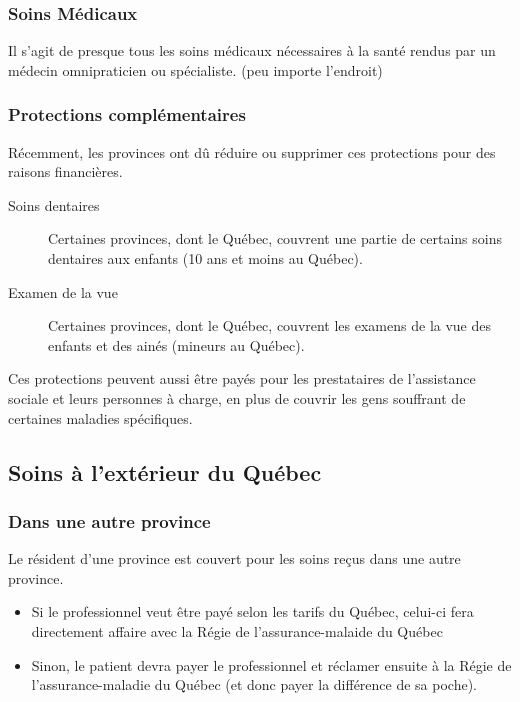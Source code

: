 \documentclass[10pt, french]{article}
\begin{document}
\begin{multicols*}{3}
	\subsubsection*{Soins Médicaux}
	Il s'agit de presque tous les soins médicaux nécessaires à la santé rendus par un médecin omnipraticien ou spécialiste. (peu importe l'endroit)
	

	\subsubsection*{Protections complémentaires}
	Récemment, les provinces ont dû réduire ou supprimer ces protections pour des raisons financières.
	\begin{description}
	\item[Soins dentaires] Certaines provinces, dont le Québec, couvrent une partie de certains soins dentaires aux enfants (10 ans et moins au Québec). 

	\item[Examen de la vue] Certaines provinces, dont le Québec, couvrent les examens de la vue des enfants et des ainés (mineurs au Québec).
	\end{description}
	Ces protections peuvent aussi être payés pour les prestataires de l'assistance sociale et leurs personnes à charge, en plus de couvrir les gens souffrant de certaines maladies spécifiques.


\subsection{Soins à l'extérieur du Québec}
	\subsubsection*{Dans une autre province}
	Le résident d'une province est couvert pour les soins reçus dans une autre province.
	\begin{itemize}
	\item	Si le professionnel veut être payé selon les tarifs du Québec, celui-ci fera directement affaire avec la Régie de l'assurance-malaide du Québec
	\item	Sinon, le patient devra payer le professionnel et réclamer ensuite à la Régie de l'assurance-maladie du Québec (et donc payer la différence de sa poche).
	\end{itemize}

\end{multicols*}
\end{document}
